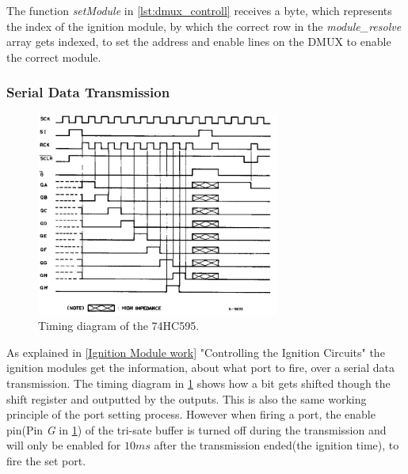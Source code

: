 

\noindent The function \textit{setModule} in \cref{lst:dmux_controll} receives a byte, which represents the index of the ignition module, by which  the correct row in the \textit{module\_resolve} array gets indexed, to set the address and enable lines on the DMUX to enable the correct module.\\

\pagebreak

\subsubsection{Serial Data Transmission}
\label{Serial Data Transmission}
\begin{figure}[!ht]
    \centering
    \includegraphics[width=8cm]{./Figures/75hc595_timing.png}
    \caption{Timing diagram of the 74HC595.}
    \label{fig:74hc595_timing}     
\end{figure}


\noindent As explained in \cref{Ignition Module work} "Controlling the Ignition Circuits" the ignition modules get the information, about what port to fire, over a serial data transmission. The timing diagram in \cref{fig:74hc595_timing} shows how a bit gets shifted though the shift register and outputted by the outputs. This is also the same working principle of the port setting process. However when firing a port, the enable pin(Pin \textit{G} in \cref{fig:74hc595_timing}) of the tri-sate buffer is turned off during the transmission and will only be enabled for $10ms$ after the transmission ended(the ignition time), to fire the set port.\\

